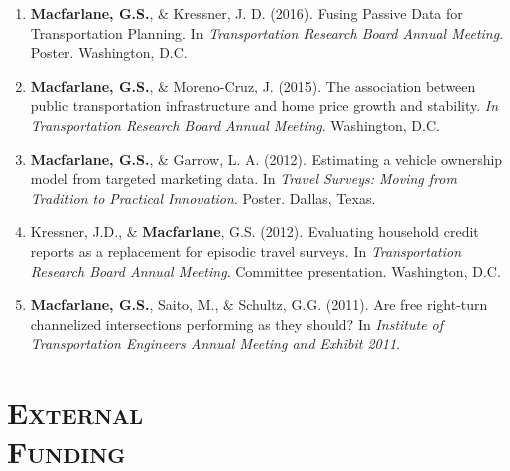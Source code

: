\documentclass[margin,line]{res}
\newcounter{enuminitialize}
\newenvironment{myenum}[1][]
{%
 \setcounter{enuminitialize}{#1}
 \addtocounter{enuminitialize}{2}
 \begin{enumerate}[left= 4pt, itemsep=12pt, start=\value{enuminitialize}, label=\arabic*\addtocounter{enumi}{-2}]
}
{%
 \end{enumerate}
}
\newcommand{\secfont}{\scshape }
\begin{document}
\begin{resume}
\begin{myenum}[27]
\item \textbf{Macfarlane, G.S.}, \& Kressner, J. D. (2016). Fusing Passive Data for Transportation Planning. In \textit{ Transportation Research Board Annual Meeting}. Poster. Washington, D.C.
\item \textbf{Macfarlane, G.S.}, \& Moreno-Cruz, J. (2015). The association between public transportation infrastructure and home price growth and stability. \textit{ In Transportation Research Board Annual Meeting}. Washington, D.C.
\item \textbf{Macfarlane, G.S.}, \& Garrow, L. A. (2012). Estimating a vehicle ownership model from targeted marketing data. In \textit{ Travel Surveys: Moving from Tradition to Practical Innovation}. Poster. Dallas, Texas.
\item Kressner, J.D., \& \textbf{Macfarlane}, G.S. (2012). Evaluating household credit reports as a replacement for episodic travel surveys. In \textit{ Transportation Research Board Annual Meeting}. Committee presentation. Washington, D.C.
\item \textbf{Macfarlane, G.S.}, Saito, M., \& Schultz, G.G. (2011). Are free right-turn channelized intersections performing as they should? In \textit{ Institute of Transportation Engineers Annual Meeting and Exhibit 2011}.
\end{myenum}



\noindent\makebox[\linewidth]{\rule{\linewidth}{0.4pt}}
\section{\secfont External \\Funding}


\end{resume}
\end{document}
